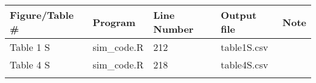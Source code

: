 \documentclass[
]{article}
\begin{document}
\begin{longtable}[]{@{}lllll@{}}
\toprule
\begin{minipage}[b]{0.13\columnwidth}\raggedright
Figure/Table \#\strut
\end{minipage} & \begin{minipage}[b]{0.18\columnwidth}\raggedright
Program\strut
\end{minipage} & \begin{minipage}[b]{0.09\columnwidth}\raggedright
Line Number\strut
\end{minipage} & \begin{minipage}[b]{0.23\columnwidth}\raggedright
Output file\strut
\end{minipage} & \begin{minipage}[b]{0.23\columnwidth}\raggedright
Note\strut
\end{minipage}\tabularnewline
\midrule
\endhead
\begin{minipage}[t]{0.13\columnwidth}\raggedright
Table 1 S\strut
\end{minipage} & \begin{minipage}[t]{0.18\columnwidth}\raggedright
sim\_code.R\strut
\end{minipage} & \begin{minipage}[t]{0.09\columnwidth}\raggedright
212 \strut
\end{minipage} & \begin{minipage}[t]{0.23\columnwidth}\raggedright
table1S.csv\strut
\end{minipage} & \begin{minipage}[t]{0.23\columnwidth}\raggedright
\strut
\end{minipage}\tabularnewline
\begin{minipage}[t]{0.13\columnwidth}\raggedright
Table 4 S\strut
\end{minipage} & \begin{minipage}[t]{0.18\columnwidth}\raggedright
sim\_code.R\strut
\end{minipage} & \begin{minipage}[t]{0.09\columnwidth}\raggedright
218\strut
\end{minipage} & \begin{minipage}[t]{0.23\columnwidth}\raggedright
table4S.csv\strut
\end{minipage} & \begin{minipage}[t]{0.23\columnwidth}\raggedright
\strut
\end{minipage}\tabularnewline
\begin{minipage}[t]{0.13\columnwidth}\raggedright

\end{minipage}
\end{longtable}
\end{document}
